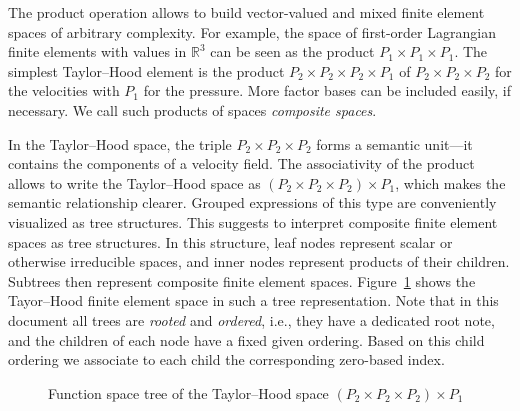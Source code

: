 \documentclass[a4paper,10pt,headings=normal,bibliography=totoc]{scrartcl}
\newcommand{\R}{\mathbb{R}}
\begin{document}
The product operation allows to build vector-valued and mixed finite element spaces of arbitrary complexity.
For example, the space of
first-order Lagrangian finite elements with values in $\R^3$ can be seen as the product $P_1 \times P_1 \times P_1$.
The simplest Taylor--Hood element is the product $P_2 \times P_2 \times P_2 \times P_1$
of $P_2 \times P_2 \times P_2$ for the velocities with $P_1$ for the pressure.
More factor bases can be included easily, if necessary.  We call such products of
spaces \emph{composite spaces}.

In the Taylor--Hood space, the triple
$P_2 \times P_2 \times P_2$ forms a semantic unit---it contains the components of a velocity field.
The associativity of the product allows to write the Taylor--Hood space
as $(P_2 \times P_2 \times P_2) \times P_1$, which makes the semantic relationship clearer.
Grouped expressions of this type are conveniently visualized as tree structures.  This
suggests to interpret composite
finite element spaces as tree structures.  In this structure, leaf nodes represent scalar or otherwise irreducible spaces,
and inner nodes represent products of their children.  Subtrees then represent composite
finite element spaces.  Figure~\ref{fig:taylor_hood_space_tree} shows the Tayor--Hood finite element
space in such a tree representation. Note that in this document all trees are \emph{rooted} and \emph{ordered},
i.e., they have a dedicated root note, and the children of each node have a fixed given ordering.
Based on this child ordering we associate to each child the corresponding zero-based index.

\begin{figure}
    \begin{center}
    \end{center}
    \caption{Function space tree of the Taylor--Hood space $(P_2 \times P_2 \times P_2)\times P_1$}
    \label{fig:taylor_hood_space_tree}
\end{figure}
\end{document}
